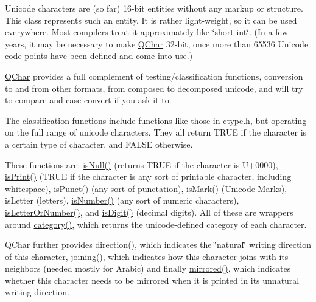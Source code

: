 Unicode characters are (so far) 16-\/bit entities without any markup or structure. This class represents such an entity. It is rather light-\/weight, so it can be used everywhere. Most compilers treat it approximately like \char`\"{}short int\char`\"{}. (In a few years, it may be necessary to make \hyperlink{class_q_char}{Q\+Char} 32-\/bit, once more than 65536 Unicode code points have been defined and come into use.)

\hyperlink{class_q_char}{Q\+Char} provides a full complement of testing/classification functions, conversion to and from other formats, from composed to decomposed unicode, and will try to compare and case-\/convert if you ask it to.

The classification functions include functions like those in ctype.\+h, but operating on the full range of unicode characters. They all return T\+R\+U\+E if the character is a certain type of character, and F\+A\+L\+S\+E otherwise.

These functions are\+: \hyperlink{class_q_char_acd16eba8ea394012940d462760ad988c}{is\+Null()} (returns T\+R\+U\+E if the character is U+0000), \hyperlink{class_q_char_a094ebe62238eeb66afaaf0e0a5356f73}{is\+Print()} (T\+R\+U\+E if the character is any sort of printable character, including whitespace), \hyperlink{class_q_char_abb93276505d07b4850c718c3e143ab9b}{is\+Punct()} (any sort of punctation), \hyperlink{class_q_char_ac280e59d39696123476367042dc9873c}{is\+Mark()} (Unicode Marks), is\+Letter (letters), \hyperlink{class_q_char_aefeb204ffe50169a4840d78d669972da}{is\+Number()} (any sort of numeric characters), \hyperlink{class_q_char_a58143f94c0ac19ca77077f91642649cd}{is\+Letter\+Or\+Number()}, and \hyperlink{class_q_char_ab9e26ae11a1a825dbb176eeb2eb33722}{is\+Digit()} (decimal digits). All of these are wrappers around \hyperlink{class_q_char_abaaecd776f6fa9619d5b79ded2815949}{category()}, which returns the unicode-\/defined category of each character.

\hyperlink{class_q_char}{Q\+Char} further provides \hyperlink{class_q_char_a19463f6223338af13ffb5ec8231d0bed}{direction()}, which indicates the \char`\"{}natural\char`\"{} writing direction of this character, \hyperlink{class_q_char_a8e2f3e25a839b13c9fe80cd3aa680273}{joining()}, which indicates how this character joins with its neighbors (needed mostly for Arabic) and finally \hyperlink{class_q_char_a1d8c62f3c5a7fdbc0fbd2446f2c4f14b}{mirrored()}, which indicates whether this character needs to be mirrored when it is printed in its unnatural writing direction.

